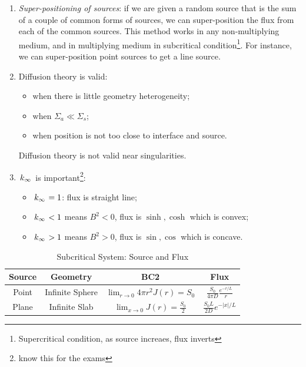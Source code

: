 \documentclass{school-22.211-notes}
\begin{document}
\clearpage
{}
\begin{enumerate}
\item \textit{Super-positioning of sources}: if we are given a random source that is the sum of a couple of common forms of sources, we can super-position the flux from each of the common sources. This method works in any non-multiplying medium, and in multiplying medium in subcritical condition\footnote{Supercritical condition, as source increaes, flux inverts}. For instance, we can super-position point sources to get a line source. 

\item Diffusion theory is valid: 
  \begin{itemize}
    \item when there is little geometry heterogeneity;
    \item when $\Sigma_a \ll \Sigma_s$;
    \item when position is not too close to interface and source.
  \end{itemize}
  Diffusion theory is not valid near singularities. 

\item $\left. k_{\infty} \right.$ is important\footnote{know this for the exams}: 
  \begin{itemize}
  \item $\left. k_{\infty} \right. = 1$: flux is straight line;
  \item $\left. k_{\infty} \right. < 1$ means $B^2 < 0$, flux is $\sinh, \cosh$ which is convex; 
  \item $\left. k_{\infty} \right. > 1$ means $B^2 > 0$, flux is $\sin, \cos$ which is concave. 
  \end{itemize}
\end{enumerate}

  \begin{table}
    \centering
    \begin{tabular}{|c|c|c|c|} \hline
      Source & Geometry & BC2 & Flux \\ \hline \hline
      Point & Infinite Sphere &$\lim_{r\to 0} 4 \pi r^2 J(r) = S_0$ & $\frac{S_0}{4\pi D} \frac{e^{-r/L}}{r}$ \\ \hline
      Plane & Infinite Slab & $\lim_{x\to 0} J(r)  = \frac{S_0}{2}$ & $\frac{S_0 L}{2D} e^{-|x|/L}$ \\ \hline
    \end{tabular}
    \caption{Subcritical System: Source and Flux} 
  \end{table}
  
  
\end{document}
